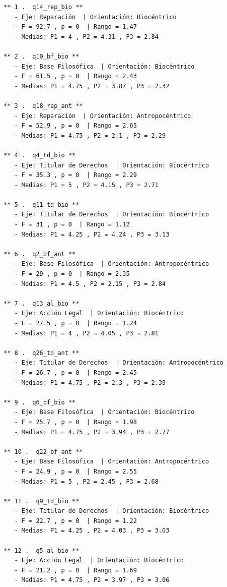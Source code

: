 \documentclass[
  11pt,
  letterpaper,
  DIV=11,
  numbers=noendperiod]{scrartcl}
\begin{document}
\begin{verbatim}
** 1 .  q14_rep_bio **
   - Eje: Reparación  | Orientación: Biocéntrico 
   - F = 92.7 , p = 0  | Rango = 1.47 
   - Medias: P1 = 4 , P2 = 4.31 , P3 = 2.84 

** 2 .  q10_bf_bio **
   - Eje: Base Filosófica  | Orientación: Biocéntrico 
   - F = 61.5 , p = 0  | Rango = 2.43 
   - Medias: P1 = 4.75 , P2 = 3.87 , P3 = 2.32 

** 3 .  q18_rep_ant **
   - Eje: Reparación  | Orientación: Antropocéntrico 
   - F = 52.9 , p = 0  | Rango = 2.65 
   - Medias: P1 = 4.75 , P2 = 2.1 , P3 = 2.29 

** 4 .  q4_td_bio **
   - Eje: Titular de Derechos  | Orientación: Biocéntrico 
   - F = 35.3 , p = 0  | Rango = 2.29 
   - Medias: P1 = 5 , P2 = 4.15 , P3 = 2.71 

** 5 .  q11_td_bio **
   - Eje: Titular de Derechos  | Orientación: Biocéntrico 
   - F = 31 , p = 0  | Rango = 1.12 
   - Medias: P1 = 4.25 , P2 = 4.24 , P3 = 3.13 

** 6 .  q2_bf_ant **
   - Eje: Base Filosófica  | Orientación: Antropocéntrico 
   - F = 29 , p = 0  | Rango = 2.35 
   - Medias: P1 = 4.5 , P2 = 2.15 , P3 = 2.84 

** 7 .  q13_al_bio **
   - Eje: Acción Legal  | Orientación: Biocéntrico 
   - F = 27.5 , p = 0  | Rango = 1.24 
   - Medias: P1 = 4 , P2 = 4.05 , P3 = 2.81 

** 8 .  q26_td_ant **
   - Eje: Titular de Derechos  | Orientación: Antropocéntrico 
   - F = 26.7 , p = 0  | Rango = 2.45 
   - Medias: P1 = 4.75 , P2 = 2.3 , P3 = 2.39 

** 9 .  q6_bf_bio **
   - Eje: Base Filosófica  | Orientación: Biocéntrico 
   - F = 25.7 , p = 0  | Rango = 1.98 
   - Medias: P1 = 4.75 , P2 = 3.94 , P3 = 2.77 

** 10 .  q22_bf_ant **
   - Eje: Base Filosófica  | Orientación: Antropocéntrico 
   - F = 24.9 , p = 0  | Rango = 2.55 
   - Medias: P1 = 5 , P2 = 2.45 , P3 = 2.68 

** 11 .  q9_td_bio **
   - Eje: Titular de Derechos  | Orientación: Biocéntrico 
   - F = 22.7 , p = 0  | Rango = 1.22 
   - Medias: P1 = 4.25 , P2 = 4.03 , P3 = 3.03 

** 12 .  q5_al_bio **
   - Eje: Acción Legal  | Orientación: Biocéntrico 
   - F = 21.2 , p = 0  | Rango = 1.69 
   - Medias: P1 = 4.75 , P2 = 3.97 , P3 = 3.06 
\end{verbatim}
\end{document}
